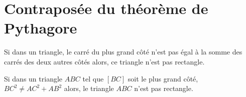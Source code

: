 \section{Contraposée du théorème de Pythagore}

\begin{propriete}
    Si dans un triangle, le carré du plus grand côté n'est pas égal à la somme des carrés des deux autres côtés alors, ce triangle n'est pas rectangle.
\end{propriete}

\begin{propriete}    
    Si dans un triangle $ABC$ tel que $[BC]$ soit le plus grand côté, $BC^2\not=AC^2+AB^2$ alors, le triangle $ABC$ n'est pas rectangle.
\end{propriete}

